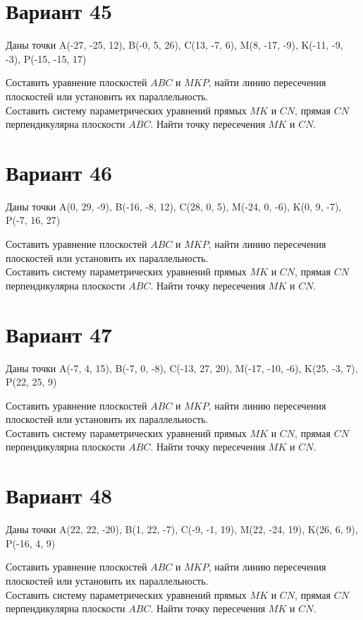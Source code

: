\documentclass[11pt]{article}
\begin{document}
\section*{Вариант 45}
Даны точки A(-27, -25, 12), B(-0, 5, 26), C(13, -7, 6), M(8, -17, -9), K(-11, -9, -3), P(-15, -15, 17)

Составить уравнение плоскостей $ABC$ и $MKP$, найти линию пересечения плоскостей или установить их параллельность.\\
Составить систему параметрических уравнений прямых $MK$ и $CN$, прямая $CN$ перпендикулярна плоскости $ABC$. Найти точку пересечения $MK$ и $CN$.

\section*{Вариант 46}
Даны точки A(0, 29, -9), B(-16, -8, 12), C(28, 0, 5), M(-24, 0, -6), K(0, 9, -7), P(-7, 16, 27)

Составить уравнение плоскостей $ABC$ и $MKP$, найти линию пересечения плоскостей или установить их параллельность.\\
Составить систему параметрических уравнений прямых $MK$ и $CN$, прямая $CN$ перпендикулярна плоскости $ABC$. Найти точку пересечения $MK$ и $CN$.

\section*{Вариант 47}
Даны точки A(-7, 4, 15), B(-7, 0, -8), C(-13, 27, 20), M(-17, -10, -6), K(25, -3, 7), P(22, 25, 9)

Составить уравнение плоскостей $ABC$ и $MKP$, найти линию пересечения плоскостей или установить их параллельность.\\
Составить систему параметрических уравнений прямых $MK$ и $CN$, прямая $CN$ перпендикулярна плоскости $ABC$. Найти точку пересечения $MK$ и $CN$.

\section*{Вариант 48}
Даны точки A(22, 22, -20), B(1, 22, -7), C(-9, -1, 19), M(22, -24, 19), K(26, 6, 9), P(-16, 4, 9)

Составить уравнение плоскостей $ABC$ и $MKP$, найти линию пересечения плоскостей или установить их параллельность.\\
Составить систему параметрических уравнений прямых $MK$ и $CN$, прямая $CN$ перпендикулярна плоскости $ABC$. Найти точку пересечения $MK$ и $CN$.
\end{document}
